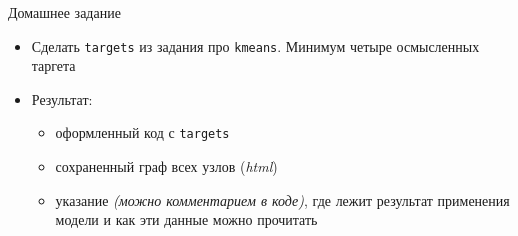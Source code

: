 \documentclass[
  ignorenonframetext,
]{beamer}
\begin{document}
\begin{frame}[fragile]{Домашнее задание}
\label{ux434ux43eux43cux430ux448ux43dux435ux435-ux437ux430ux434ux430ux43dux438ux435}
\begin{itemize}
\item
  Сделать \texttt{targets} из задания про \texttt{kmeans}. Минимум
  четыре осмысленных таргета
\item
  Результат:

  \begin{itemize}
  \item
    оформленный код с \texttt{targets}
  \item
    сохраненный граф всех узлов (\emph{html})
  \item
    указание \emph{(можно комментарием в коде)}, где лежит результат
    применения модели и как эти данные можно прочитать
  \end{itemize}
\end{itemize}
\end{frame}
\end{document}
